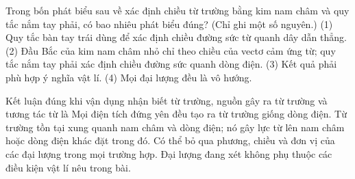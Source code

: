 \begin{ex}
Trong bốn phát biểu sau về xác định chiều từ trường bằng kim nam châm và quy tắc nắm tay phải, có bao nhiêu phát biểu đúng? (Chỉ ghi một số nguyên.) (1) Quy tắc bàn tay trái dùng để xác định chiều đường sức từ quanh dây dẫn thẳng. (2) Đầu Bắc của kim nam châm nhỏ chỉ theo chiều của vectơ cảm ứng từ; quy tắc nắm tay phải xác định chiều đường sức quanh dòng điện. (3) Kết quả phải phù hợp ý nghĩa vật lí. (4) Mọi đại lượng đều là vô hướng.
\end{ex}

\begin{ex}
Kết luận đúng khi vận dụng nhận biết từ trường, nguồn gây ra từ trường và tương tác từ là
\choice
{Mọi điện tích đứng yên đều tạo ra từ trường giống dòng điện.}
{\True Từ trường tồn tại xung quanh nam châm và dòng điện; nó gây lực từ lên nam châm hoặc dòng điện khác đặt trong đó.}
{Có thể bỏ qua phương, chiều và đơn vị của các đại lượng trong mọi trường hợp.}
{Đại lượng đang xét không phụ thuộc các điều kiện vật lí nêu trong bài.}
\end{ex}

